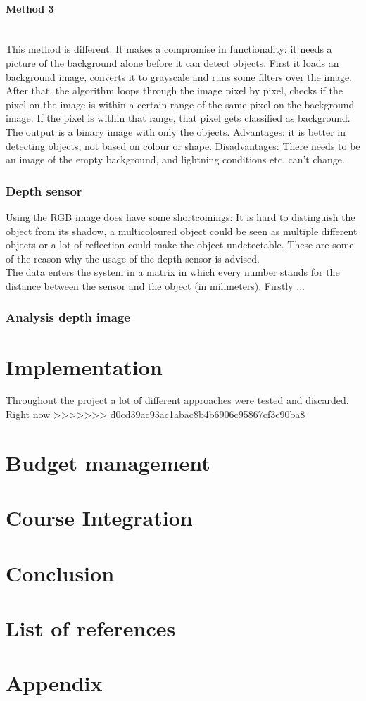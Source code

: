 \documentclass[11pt]{article}
\begin{document}
\paragraph{Method 3}\mbox{}\\
This method is different. It makes a compromise in functionality: it needs a picture of the background alone before it can detect objects. First it loads an background image, converts it to grayscale and runs some filters over the image. After that, the algorithm loops through the image pixel by pixel, checks if the pixel on the image is within a certain range of the same pixel on the background image. If the pixel is within that range, that pixel gets classified as background. The output is a binary image with only the objects.  
Advantages: it is better in detecting objects, not based on colour or shape.
Disadvantages: There needs to be an image of the empty background, and lightning conditions etc. can’t change.

\newpage


\subsubsection{Depth sensor}
Using the RGB image does have some shortcomings: It is hard to distinguish the object from its shadow, a multicoloured object could be seen as multiple different objects or a lot of reflection could make the object undetectable. These are some of the reason why the usage of the depth sensor is advised.
\\

The data enters the system in a matrix in which every number stands for the distance between the sensor and the object (in milimeters). Firstly ...  

     


\subsubsection{Analysis depth image}

\section{Implementation}
Throughout the project a lot of different approaches were tested and discarded. Right now 
>>>>>>> d0cd39ac93ac1abac8b4b6906c95867cf3c90ba8

\section{Budget management}

\section{Course Integration}

\section{Conclusion}

\section{List of references}

\section{Appendix}
\end{document}
